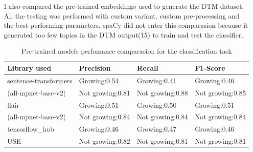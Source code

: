 \documentclass[12pt,MSc,a4paper,oneside]{muthesis}
\begin{document}
I also compared the pre-trained embeddings used to generate the DTM dataset. All the testing was performed with custom variant, custom pre-processing and the best performing parameters. spaCy did not enter this comparasion because it generated too few topics in the DTM output(15) to train and test the classifier.
\begin{table}[h]
  \caption{Pre-trained models perfomance comparasion for the classification task}
  \label{tab:pretrained-models}
  \begin{tabularx}{\textwidth}{|X|X|X|X|}
    \toprule
    {Library used}&{Precision}&{Recall}&{F1-Score}\\
    \midrule
    sentence-transformers & Growing:0.54 & Growing:0.41 & Growing:0.46 \\
    (all-mpnet-base-v2) & Not growing:0.81 & Not growing:0.88 & Not growing:0.85\\\hline
    flair & Growing:0.51 & Growing:0.50 & Growing:0.51 \\
    (all-mpnet-base-v2) & Not growing:0.84 & Not growing:0.84 & Not growing:0.84\\\hline
    tensorflow\_hub & Growing:0.46 & Growing:0.47 & Growing:0.46 \\
    USE & Not growing:0.82 & Not growing:0.81 & Not growing:0.81\\\hline
  \bottomrule
\end{tabularx}
\end{table}
\end{document}
